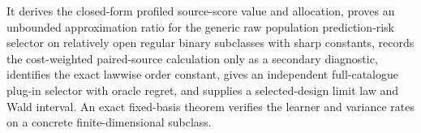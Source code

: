 It derives the closed-form profiled source-score value and allocation, proves an unbounded approximation ratio for the generic raw population prediction-risk selector on relatively open regular binary subclasses with sharp constants, records the cost-weighted paired-source calculation only as a secondary diagnostic, identifies the exact lawwise order constant, gives an independent full-catalogue plug-in selector with oracle regret, and supplies a selected-design limit law and Wald interval. An exact fixed-basis theorem verifies the learner and variance rates on a concrete finite-dimensional subclass.